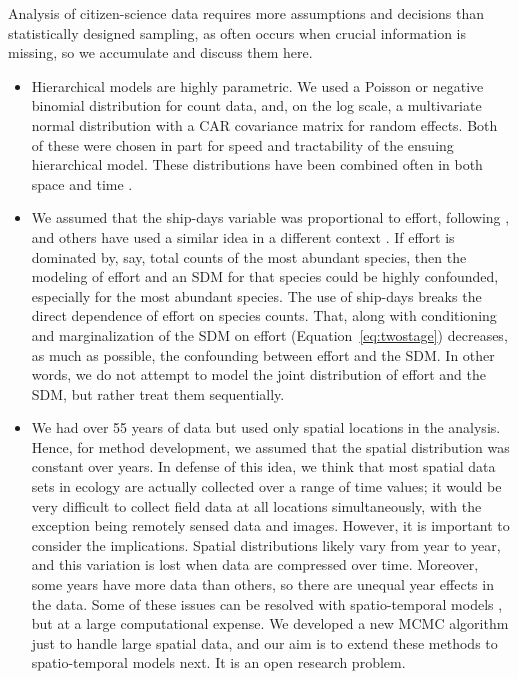 \documentclass[11pt, titlepage]{article}
\begin{document}
\begin{spacing}{1.9}
\begin{flushleft}
Analysis of citizen-science data requires more assumptions and decisions than statistically designed sampling, as often occurs when crucial information is missing, so we accumulate and discuss them here.

\begin{itemize}

  \item Hierarchical models are highly parametric.  We used a Poisson or negative binomial distribution for count data, and, on the log scale, a multivariate normal distribution with a CAR covariance matrix for random effects. Both of these were chosen in part for speed and tractability of the ensuing hierarchical model.  These distributions have been combined often in both space \citep[e.g.,][]{wakefield_disease_2007, mohebbi_disease_2014} and time \citep[e.g.,][]{zhu_negative_2011, chen_autoregressive_2016}.
  \item We assumed that the ship-days variable was proportional to effort, following \citet{HimesBoorEtAl2012Stellersealion}, and others have used a similar idea in a different context \citep[e.g.,][]{gomes_species_2018}. If effort is dominated by, say, total counts of the most abundant species, then the modeling of effort and an SDM for that species could be highly confounded, especially for the most abundant species.  The use of ship-days breaks the direct dependence of effort on species counts.  That, along with conditioning and marginalization of the SDM on effort (Equation~\ref{eq:twostage}) decreases, as much as possible, the confounding between effort and the SDM.  In other words, we do not attempt to model the joint distribution of effort and the SDM, but rather treat them sequentially.
  \item We had over 55 years of data but used only spatial locations in the analysis.  Hence, for method development, we assumed that the spatial distribution was constant over years. In defense of this idea, we think that most spatial data sets in ecology are actually collected over a range of time values; it would be very difficult to collect field data at all locations simultaneously, with the exception being remotely sensed data and images.  However, it is important to consider the implications.  Spatial distributions likely vary from year to year, and this variation is lost when data are compressed over time.  Moreover, some years have more data than others, so there are unequal year effects in the data.  Some of these issues can be resolved with spatio-temporal models \citep{CressieEtAl2011StatisticsSpatiotemporalData}, but at a large computational expense.  We developed a new MCMC algorithm just to handle large spatial data, and our aim is to extend these methods to spatio-temporal models next. It is an open research problem.

\end{itemize}
\end{flushleft}
\end{spacing}
\end{document}
